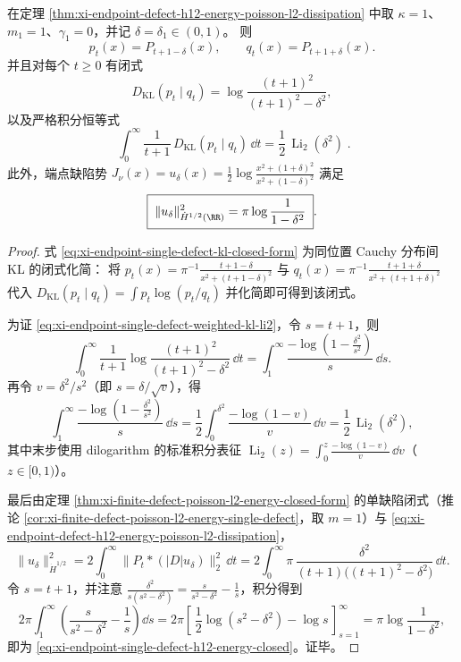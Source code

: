 \begin{corollary}\label{cor:xi-endpoint-single-defect-weighted-kl-li2}
在定理 \ref{thm:xi-endpoint-defect-h12-energy-poisson-l2-dissipation} 中取 \(\kappa=1\)、\(m_1=1\)、\(\gamma_1=0\)，并记 \(\delta=\delta_1\in(0,1)\)。
则
\[
p_t(x)=P_{t+1-\delta}(x),\qquad q_t(x)=P_{t+1+\delta}(x).
\]
并且对每个 \(t\ge0\) 有闭式
\begin{equation}\label{eq:xi-endpoint-single-defect-kl-closed-form}
D_{\mathrm{KL}}(p_t\mid q_t)=\log\frac{(t+1)^2}{(t+1)^2-\delta^2},
\end{equation}
以及严格积分恒等式
\begin{equation}\label{eq:xi-endpoint-single-defect-weighted-kl-li2}
\boxed{\;
\int_0^\infty \frac{1}{t+1}\,D_{\mathrm{KL}}(p_t\mid q_t)\,\dd t
=\frac12\,\operatorname{Li}_2(\delta^2)\; }.
\end{equation}
此外，端点缺陷势
\(
J_\nu(x)=u_\delta(x)=\frac12\log\frac{x^2+(1+\delta)^2}{x^2+(1-\delta)^2}
\)
满足
\begin{equation}\label{eq:xi-endpoint-single-defect-h12-energy-closed}
\boxed{\;
\|u_\delta\|_{\dot H^{1/2}(\RR)}^2=\pi\log\frac{1}{1-\delta^2}\; }.
\end{equation}
\end{corollary}
\begin{proof}
式 \eqref{eq:xi-endpoint-single-defect-kl-closed-form} 为同位置 Cauchy 分布间 KL 的闭式化简：
将
\(
p_t(x)=\pi^{-1}\frac{t+1-\delta}{x^2+(t+1-\delta)^2}
\)
与
\(
q_t(x)=\pi^{-1}\frac{t+1+\delta}{x^2+(t+1+\delta)^2}
\)
代入 \(D_{\mathrm{KL}}(p_t\mid q_t)=\int p_t\log(p_t/q_t)\) 并化简即可得到该闭式。
\par
为证 \eqref{eq:xi-endpoint-single-defect-weighted-kl-li2}，令 \(s=t+1\)，则
\[
\int_0^\infty \frac{1}{t+1}\log\frac{(t+1)^2}{(t+1)^2-\delta^2}\,\dd t
=\int_{1}^{\infty}\frac{-\log\!\left(1-\frac{\delta^2}{s^2}\right)}{s}\,\dd s.
\]
再令 \(v=\delta^2/s^2\)（即 \(s=\delta/\sqrt v\)），得
\[
\int_{1}^{\infty}\frac{-\log\!\left(1-\frac{\delta^2}{s^2}\right)}{s}\,\dd s
=\frac12\int_{0}^{\delta^2}\frac{-\log(1-v)}{v}\,\dd v
=\frac12\,\operatorname{Li}_2(\delta^2),
\]
其中末步使用 dilogarithm 的标准积分表征
\(
\operatorname{Li}_2(z)=\int_0^{z}\frac{-\log(1-v)}{v}\,\dd v
\)（\(z\in[0,1)\)）。
\par
最后由定理 \ref{thm:xi-finite-defect-poisson-l2-energy-closed-form} 的单缺陷闭式（推论 \ref{cor:xi-finite-defect-poisson-l2-energy-single-defect}，取 \(m=1\)）与
\eqref{eq:xi-endpoint-defect-h12-energy-poisson-l2-dissipation}，
\[
\|u_\delta\|_{\dot H^{1/2}}^2
=2\int_0^\infty \bigl\|P_t*(|D|u_\delta)\bigr\|_2^2\,\dd t
=2\int_0^\infty \pi\,\frac{\delta^2}{(t+1)\bigl((t+1)^2-\delta^2\bigr)}\,\dd t.
\]
令 \(s=t+1\)，并注意
\(
\frac{\delta^2}{s(s^2-\delta^2)}=\frac{s}{s^2-\delta^2}-\frac{1}{s}
\)，积分得到
\[
2\pi\int_{1}^{\infty}\left(\frac{s}{s^2-\delta^2}-\frac{1}{s}\right)\dd s
=2\pi\left[\,\frac12\log(s^2-\delta^2)-\log s\,\right]_{s=1}^{\infty}
=\pi\log\frac{1}{1-\delta^2},
\]
即为 \eqref{eq:xi-endpoint-single-defect-h12-energy-closed}。证毕。
\end{proof}

